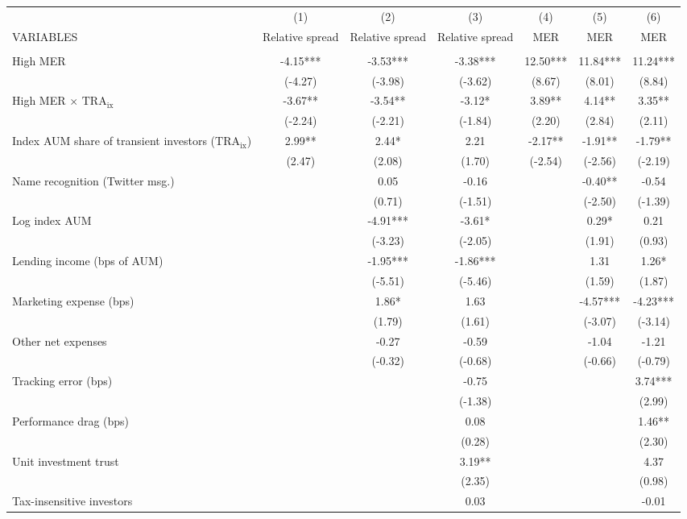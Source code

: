 \documentclass[]{article}
\begin{document}
\begin{tabular}{lcccccc} \hline
 & (1) & (2) & (3) & (4) & (5) & (6) \\
VARIABLES & Relative spread & Relative spread & Relative spread & MER & MER & MER \\ \hline
 &  &  &  &  &  &  \\
High MER & -4.15*** & -3.53*** & -3.38*** & 12.50*** & 11.84*** & 11.24*** \\
 & (-4.27) & (-3.98) & (-3.62) & (8.67) & (8.01) & (8.84) \\
High MER $\times$ $\text{TRA}_\text{ix}$ & -3.67** & -3.54** & -3.12* & 3.89** & 4.14** & 3.35** \\
 & (-2.24) & (-2.21) & (-1.84) & (2.20) & (2.84) & (2.11) \\
Index AUM share of transient investors ($\text{TRA}_\text{ix}$) & 2.99** & 2.44* & 2.21 & -2.17** & -1.91** & -1.79** \\
 & (2.47) & (2.08) & (1.70) & (-2.54) & (-2.56) & (-2.19) \\
Name recognition (Twitter msg.) &  & 0.05 & -0.16 &  & -0.40** & -0.54 \\
 &  & (0.71) & (-1.51) &  & (-2.50) & (-1.39) \\
Log index AUM &  & -4.91*** & -3.61* &  & 0.29* & 0.21 \\
 &  & (-3.23) & (-2.05) &  & (1.91) & (0.93) \\
Lending income (bps of AUM) &  & -1.95*** & -1.86*** &  & 1.31 & 1.26* \\
 &  & (-5.51) & (-5.46) &  & (1.59) & (1.87) \\
Marketing expense (bps) &  & 1.86* & 1.63 &  & -4.57*** & -4.23*** \\
 &  & (1.79) & (1.61) &  & (-3.07) & (-3.14) \\
Other net expenses &  & -0.27 & -0.59 &  & -1.04 & -1.21 \\
 &  & (-0.32) & (-0.68) &  & (-0.66) & (-0.79) \\
Tracking error (bps) &  &  & -0.75 &  &  & 3.74*** \\
 &  &  & (-1.38) &  &  & (2.99) \\
Performance drag (bps) &  &  & 0.08 &  &  & 1.46** \\
 &  &  & (0.28) &  &  & (2.30) \\
Unit investment trust &  &  & 3.19** &  &  & 4.37 \\
 &  &  & (2.35) &  &  & (0.98) \\
Tax-insensitive investors &  &  & 0.03 &  &  & -0.01 \\

\end{tabular}
\end{document}
